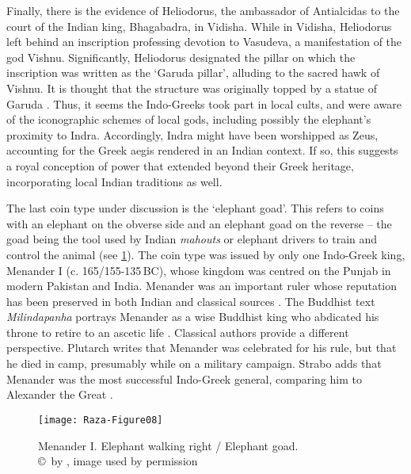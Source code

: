 \documentclass{ijsra}
\renewcommand\BC{{\,BC\xspace}}
\begin{document}
Finally, there is the evidence of Heliodorus, the ambassador of Antialcidas to the court of the Indian king, Bhagabadra, in Vidisha.
While in Vidisha, Heliodorus left behind an inscription professing devotion to Vasudeva, a manifestation of the god Vishnu.
Significantly, Heliodorus designated the pillar on which the inscription was written as the ‘Garuda pillar’, alluding to the sacred hawk of Vishnu.
It is thought that the structure was originally topped by a statue of Garuda \parencite[126--127]{Mairs2014}.
Thus, it seems the Indo-Greeks took part in local cults, and were aware of the iconographic schemes of local gods, including possibly the elephant’s proximity to Indra.
Accordingly, Indra might have been worshipped as Zeus, accounting for the Greek aegis rendered in an Indian context.
If so, this suggests a royal conception of power that extended beyond their Greek heritage, incorporating local Indian traditions as well.

The last coin type under discussion is the ‘elephant goad’.
This refers to coins with an elephant on the obverse side and an elephant goad on the reverse – the goad being the tool used by Indian \emph{mahouts} or elephant drivers to train and control the animal (see \cref{fig:Raza-Figure08}).
The coin type was issued by only one Indo-Greek king, Menander I (c. 165/155-135\BC), whose kingdom was centred on the Punjab in modern Pakistan and India.
Menander was an important ruler whose reputation has been preserved in both Indian and classical sources \parencite[14--17]{Bopearachchi1993}.
The Buddhist text \emph{Milindapanha} portrays Menander as a wise Buddhist king who abdicated his throne to retire to an ascetic life \parencite[14--17]{Bopearachchi1993}.
Classical authors provide a different perspective.
Plutarch writes that Menander was celebrated for his rule, but that he died in camp, presumably while on a military campaign.
Strabo adds that Menander was the most successful Indo-Greek general, comparing him to Alexander the Great .

\begin{figure}[!htb] %
	\centering
	\texttt{[image: Raza-Figure08]}
	\caption{Menander I. Elephant walking right / Elephant goad.
		{\normalfont\scriptsize \\ \copyright\ by \cite{Coin}, image used by permission}}
	\label{fig:Raza-Figure08}
\end{figure}
\end{document}
